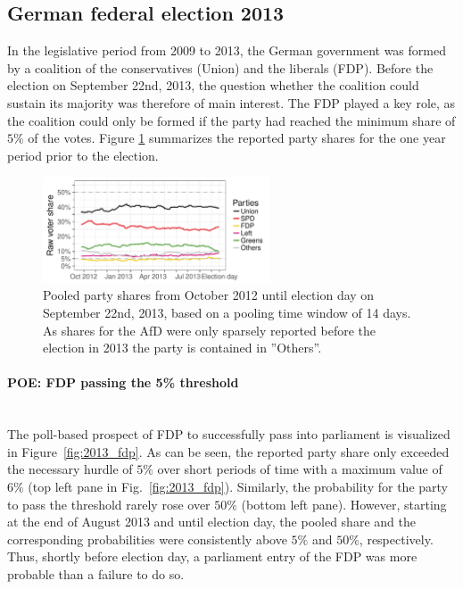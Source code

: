 \documentclass[smallcondensed]{svjour3}     %
\begin{document}
\subsection{German federal election 2013} \label{subsec:2013}
In the legislative period from 2009 to 2013, the German government was formed by
a coalition of the conservatives (Union) and the liberals (FDP). Before the
election on September 22nd, 2013, the question whether the coalition could
sustain its majority was therefore of main interest. The FDP played a key role,
as the coalition could only be formed if the party had reached the minimum share
of $5\%$ of the votes. Figure \ref{fig:2013} summarizes the reported party shares
for the one year period prior to the election.

\begin{figure}[H]\centering
\includegraphics[width=0.6\textwidth]{figures/2013_pooled_rawShares.pdf}
\caption{Pooled party shares from October 2012 until election day on
September 22nd, 2013, based on a pooling time window of 14 days.
As shares for the AfD were only sparsely reported before the election in 2013
the party is contained in ''Others''.
\label{fig:2013}
}
\end{figure}


\paragraph{POE: FDP passing the 5\% threshold} \ \\

The poll-based prospect of FDP to successfully pass into parliament is visualized
in Figure~\ref{fig:2013_fdp}.
As can be seen, the reported party share only exceeded the necessary hurdle
of $5\%$ over short periods of time with a maximum value
of $6\%$ (top left pane in Fig.~\ref{fig:2013_fdp}). Similarly, the probability
for the party to pass the threshold rarely rose over $50\%$ (bottom left pane).
However, starting at the end of August 2013 and until election day, the pooled
share and the corresponding probabilities were consistently above $5\%$ and $50\%$,
respectively. Thus, shortly before election day, a parliament entry
of the FDP was more probable than a failure to do so.\\
\end{document}
